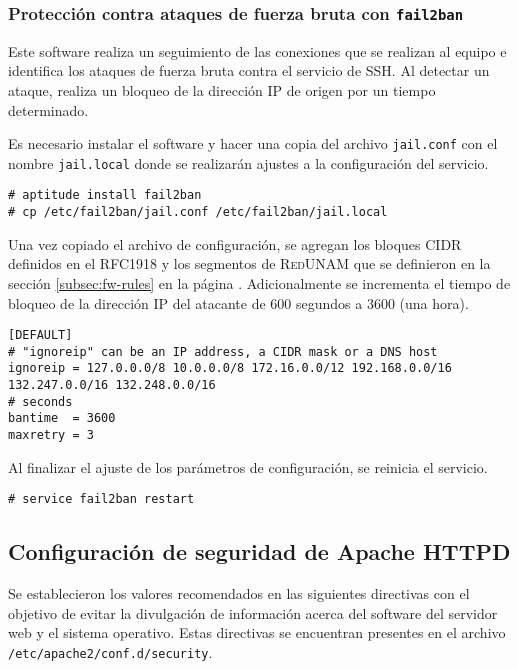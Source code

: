         \subsubsection {Protecci\'{o}n contra ataques de fuerza bruta con \texttt{fail2ban}}

Este software realiza un seguimiento de las conexiones que se realizan al equipo e identifica los ataques de fuerza bruta contra el servicio de \textsc{SSH}. Al detectar un ataque, realiza un bloqueo de la direcci\'{o}n \textsc{IP} de origen por un tiempo determinado.

Es necesario instalar el software y hacer una copia del archivo \texttt{jail.conf} con el nombre \texttt{jail.local} donde se realizar\'{a}n ajustes a la configuraci\'{o}n del servicio.

{
\scriptsize
\linespread{1}
\begin{verbatim}
# aptitude install fail2ban
# cp /etc/fail2ban/jail.conf /etc/fail2ban/jail.local
\end{verbatim}
}

Una vez copiado el archivo de configuraci\'{o}n, se agregan los bloques \textsc{CIDR} definidos en el \textsc{RFC1918} y los segmentos de \textsc{RedUNAM} que se definieron en la secci\'{o}n \ref{subsec:fw-rules} en la p\'{a}gina \pageref{subsec:fw-rules}. Adicionalmente se incrementa el tiempo de bloqueo de la direcci\'{o}n IP del atacante de 600 segundos a 3600 (una hora).

{
\scriptsize
\linespread{1}
\begin{verbatim}
[DEFAULT]
# "ignoreip" can be an IP address, a CIDR mask or a DNS host
ignoreip = 127.0.0.0/8 10.0.0.0/8 172.16.0.0/12 192.168.0.0/16 132.247.0.0/16 132.248.0.0/16
# seconds
bantime  = 3600
maxretry = 3
\end{verbatim}
}

Al finalizar el ajuste de los par\'{a}metros de configuraci\'{o}n, se reinicia el servicio.

{
\scriptsize
\linespread{1}
\begin{verbatim}
# service fail2ban restart
\end{verbatim}
}

      \subsection {Configuraci\'{o}n de seguridad de Apache HTTPD}

Se establecieron los valores recomendados en las siguientes directivas con el objetivo de evitar la divulgaci\'{o}n de informaci\'{o}n acerca del software del servidor web y el sistema operativo. Estas directivas se encuentran presentes en el archivo \texttt{/etc/apache2/conf.d/security}.

